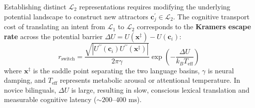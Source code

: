 \documentclass[11pt,letterpaper]{article}
\begin{document}
Establishing distinct $\mathcal{L}_2$ representations requires modifying the underlying potential landscape to construct new attractors $\mathbf{c}_j^{\prime} \in \mathcal{L}_2$. The cognitive transport cost of translating an intent from $\mathcal{L}_1$ to $\mathcal{L}_2$ corresponds to the \textbf{Kramers escape rate} across the potential barrier $\Delta U = U(\mathbf{x}^\ddagger) - U(\mathbf{c}_i)$:
\begin{equation}
r_{\text{switch}} = \frac{\sqrt{|U^{\prime\prime}(\mathbf{c}_i) U^{\prime\prime}(\mathbf{x}^\ddagger)|}}{2\pi \gamma} \exp\left( -\frac{\Delta U}{k_B T_{\text{eff}}} \right)
\end{equation}
where $\mathbf{x}^\ddagger$ is the saddle point separating the two language basins, $\gamma$ is neural damping, and $T_{\text{eff}}$ represents metabolic arousal or attentional temperature. In novice bilinguals, $\Delta U$ is large, resulting in slow, conscious lexical translation and measurable cognitive latency ($\sim 200$--$400\text{ ms}$).
\end{document}
